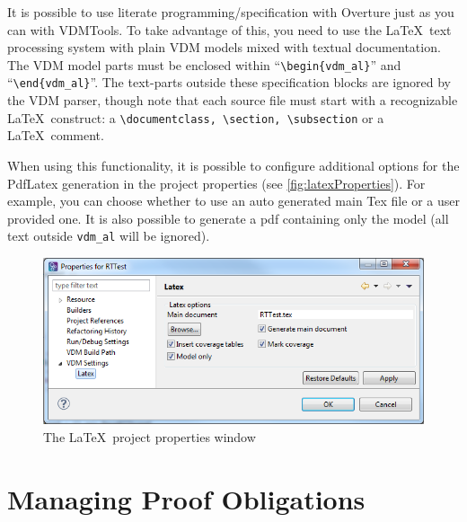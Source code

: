 \documentclass{overturerepchap}
\begin{document}
It is possible to use literate programming/specification \cite{Johnson96} with
Overture just as you can with VDMTools. To take advantage of this,
you need to use the \LaTeX\ text processing system with
plain VDM models mixed with textual documentation.  The VDM model parts must be
enclosed within ``\verb+\begin{vdm_al}+'' and ``\verb+\end{vdm_al}+''. The
text-parts outside these specification blocks are ignored by the VDM parser,
though note that each source file must start with a recognizable \LaTeX\
construct: a \verb+\documentclass, \section, \subsection+ or a \LaTeX\ comment.

When using this functionality, it is possible to configure additional options
for the PdfLatex generation in the project properties (see
\autoref{fig:latexProperties}). For example, you can choose whether to use an
auto generated main Tex file or a user provided one.  It is also possible to
generate a pdf containing only the model (all text outside \texttt{vdm\_al}
will be ignored).

\begin{figure}[!htb]
\begin{center}
  \includegraphics[width=\textwidth]{screenDumps/latex_properties}
  \caption{The \LaTeX\ project properties window}
  \label{fig:latexProperties}
\end{center}
\end{figure}


\chapter{Managing Proof Obligations}\label{sec:POmanagement}
\end{document}
